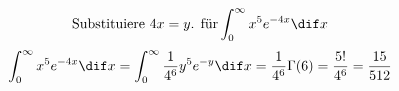 \begin{example}
	\begin{equation*}
		\text{Substituiere $4x = y$. für}\int_{0}^{\infty} x^5 e^{-4x} \dif x
	\end{equation*}
	\begin{equation*}
		\int_{0}^{\infty} x^5 e^{-4x} \dif x = \int_{0}^{\infty} \frac{1}{4^6} y^5 e^{-y} \dif x = \frac{1}{4^6} \Gamma (6) = \frac{5!}{4^6} = \frac{15}{512} 
	\end{equation*}
\end{example}